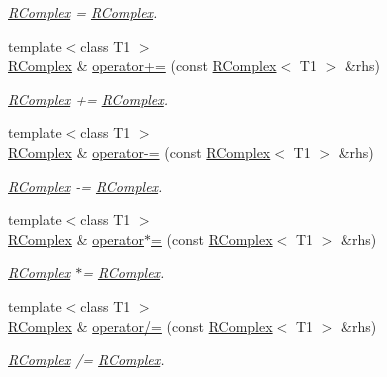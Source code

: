 \begin{DoxyCompactItemize}
\begin{DoxyCompactList}\small\item\em \mbox{\hyperlink{classENSEM_1_1RComplex}{R\+Complex}} = \mbox{\hyperlink{classENSEM_1_1RComplex}{R\+Complex}}. \end{DoxyCompactList}\item 
{\footnotesize template$<$class T1 $>$ }\\\mbox{\hyperlink{classENSEM_1_1RComplex}{R\+Complex}} \& \mbox{\hyperlink{classENSEM_1_1RComplex_aca53957ad00d064844898e907e6f6fab}{operator+=}} (const \mbox{\hyperlink{classENSEM_1_1RComplex}{R\+Complex}}$<$ T1 $>$ \&rhs)
\begin{DoxyCompactList}\small\item\em \mbox{\hyperlink{classENSEM_1_1RComplex}{R\+Complex}} += \mbox{\hyperlink{classENSEM_1_1RComplex}{R\+Complex}}. \end{DoxyCompactList}\item 
{\footnotesize template$<$class T1 $>$ }\\\mbox{\hyperlink{classENSEM_1_1RComplex}{R\+Complex}} \& \mbox{\hyperlink{classENSEM_1_1RComplex_aa2ad7391f0a0df5381ae7402b8b1fdb8}{operator-\/=}} (const \mbox{\hyperlink{classENSEM_1_1RComplex}{R\+Complex}}$<$ T1 $>$ \&rhs)
\begin{DoxyCompactList}\small\item\em \mbox{\hyperlink{classENSEM_1_1RComplex}{R\+Complex}} -\/= \mbox{\hyperlink{classENSEM_1_1RComplex}{R\+Complex}}. \end{DoxyCompactList}\item 
{\footnotesize template$<$class T1 $>$ }\\\mbox{\hyperlink{classENSEM_1_1RComplex}{R\+Complex}} \& \mbox{\hyperlink{classENSEM_1_1RComplex_a9b5f1c26c1d2cca0a3a0a6d38b5e49bd}{operator$\ast$=}} (const \mbox{\hyperlink{classENSEM_1_1RComplex}{R\+Complex}}$<$ T1 $>$ \&rhs)
\begin{DoxyCompactList}\small\item\em \mbox{\hyperlink{classENSEM_1_1RComplex}{R\+Complex}} $\ast$= \mbox{\hyperlink{classENSEM_1_1RComplex}{R\+Complex}}. \end{DoxyCompactList}\item 
{\footnotesize template$<$class T1 $>$ }\\\mbox{\hyperlink{classENSEM_1_1RComplex}{R\+Complex}} \& \mbox{\hyperlink{classENSEM_1_1RComplex_af06d63062569441e7fc7bb532334a109}{operator/=}} (const \mbox{\hyperlink{classENSEM_1_1RComplex}{R\+Complex}}$<$ T1 $>$ \&rhs)
\begin{DoxyCompactList}\small\item\em \mbox{\hyperlink{classENSEM_1_1RComplex}{R\+Complex}} /= \mbox{\hyperlink{classENSEM_1_1RComplex}{R\+Complex}}. \end{DoxyCompactList}\item 

\end{DoxyCompactItemize}

